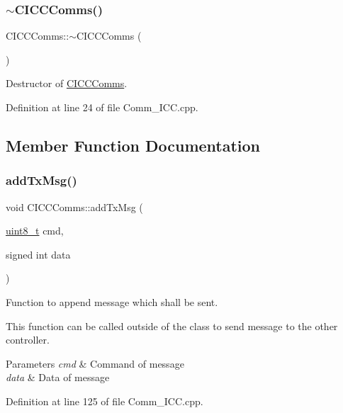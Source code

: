 \subsubsection{\texorpdfstring{$\sim$CICCComms()}{~CICCComms()}}
{\footnotesize\ttfamily C\+I\+C\+C\+Comms\+::$\sim$\+C\+I\+C\+C\+Comms (\begin{DoxyParamCaption}{ }\end{DoxyParamCaption})}



Destructor of \mbox{\hyperlink{class_c_i_c_c_comms}{C\+I\+C\+C\+Comms}}. 



Definition at line 24 of file Comm\+\_\+\+I\+C\+C.\+cpp.



\subsection{Member Function Documentation}
\mbox{\label{class_c_i_c_c_comms_ab925dd7ff82f30ccd9f770ab2281b3ab}} 
\subsubsection{\texorpdfstring{addTxMsg()}{addTxMsg()}}
{\footnotesize\ttfamily void C\+I\+C\+C\+Comms\+::add\+Tx\+Msg (\begin{DoxyParamCaption}\item[{\mbox{\hyperlink{_a_d_a_s___types_8h_aba7bc1797add20fe3efdf37ced1182c5}{uint8\+\_\+t}}}]{cmd,  }\item[{signed int}]{data }\end{DoxyParamCaption})\hspace{0.3cm}{\ttfamily [virtual]}}



Function to append message which shall be sent. 

This function can be called outside of the class to send message to the other controller. 
\begin{DoxyParams}{Parameters}
{\em cmd} & Command of message \\
\hline
{\em data} & Data of message \\
\hline
\end{DoxyParams}


Definition at line 125 of file Comm\+\_\+\+I\+C\+C.\+cpp.

